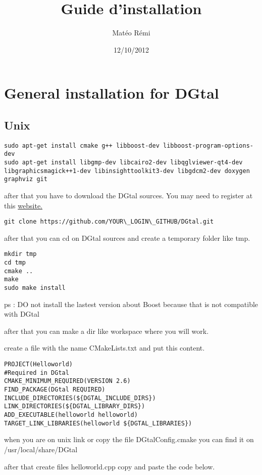 \documentclass{article}
\title{Guide d'installation}
\author{Matéo Rémi}
\date{12/10/2012}
\begin{document}
\maketitle

\section{General installation for DGtal}

\subsection{Unix}
\begin{verbatim}
sudo apt-get install cmake g++ libboost-dev libboost-program-options-dev
sudo apt-get install libgmp-dev libcairo2-dev libqglviewer-qt4-dev
libgraphicsmagick++1-dev libinsighttoolkit3-dev libgdcm2-dev doxygen graphviz git
\end{verbatim}

after that you have to download the DGtal sources. You may need to register at this \href{https://github.com/}{website.}\\


\begin{verbatim}
git clone https://github.com/YOUR\_LOGIN\_GITHUB/DGtal.git
\end{verbatim}

after that you can cd on DGtal sources and create a temporary folder like tmp.
\begin{verbatim}
mkdir tmp
cd tmp
cmake ..
make
sudo make install
\end{verbatim}

ps : DO not install the lastest version about Boost because that is not compatible with DGtal

after that you can  make a dir like workspace where you will work.


create a file with the name CMakeLists.txt
and put this content.
\begin{verbatim}
PROJECT(Helloworld)
#Required in DGtal
CMAKE_MINIMUM_REQUIRED(VERSION 2.6)
FIND_PACKAGE(DGtal REQUIRED)
INCLUDE_DIRECTORIES(${DGTAL_INCLUDE_DIRS})
LINK_DIRECTORIES(${DGTAL_LIBRARY_DIRS})
ADD_EXECUTABLE(helloworld helloworld)
TARGET_LINK_LIBRARIES(helloworld ${DGTAL_LIBRARIES})
\end{verbatim}

when you are on unix link or copy the file DGtalConfig.cmake you can find it on /usr/local/share/DGtal

after that create files helloworld.cpp copy and paste the code below.
\end{document}
